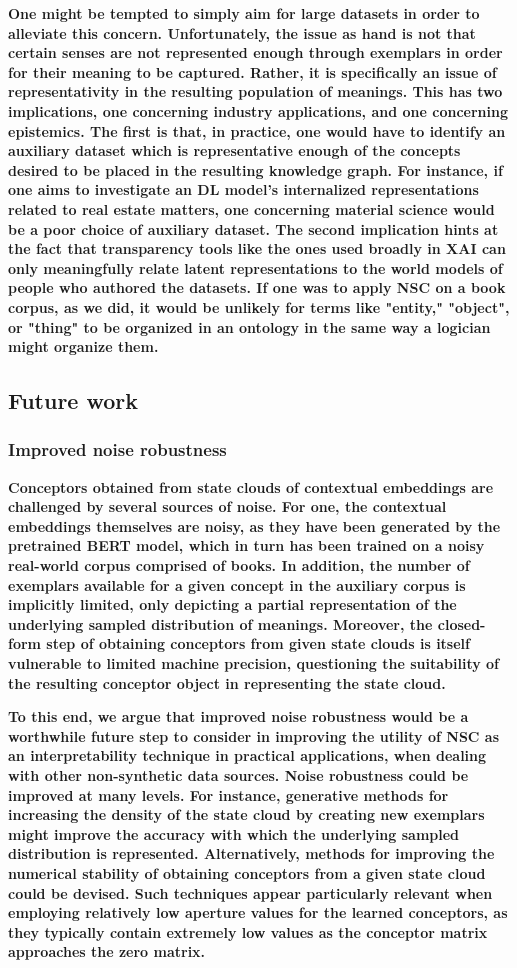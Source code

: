 \textbf{One might be tempted to simply aim for large datasets in order to alleviate this concern. Unfortunately, the issue as hand is not that certain senses are not represented enough through exemplars in order for their meaning to be captured. Rather, it is specifically an issue of representativity in the resulting population of meanings. This has two implications, one concerning industry applications, and one concerning epistemics. The first is that, in practice, one would have to identify an auxiliary dataset which is representative enough of the concepts desired to be placed in the resulting knowledge graph. For instance, if one aims to investigate an DL model's internalized representations related to real estate matters, one concerning material science would be a poor choice of auxiliary dataset. The second implication hints at the fact that transparency tools like the ones used broadly in XAI can only meaningfully relate latent representations to the world models of people who authored the datasets. If one was to apply NSC on a book corpus, as we did, it would be unlikely for terms like "entity," "object", or "thing" to be organized in an ontology in the same way a logician might organize them.}

\subsection{Future work}

\subsubsection{Improved noise robustness}

\textbf{Conceptors obtained from state clouds of contextual embeddings are challenged by several sources of noise. For one, the contextual embeddings themselves are noisy, as they have been generated by the pretrained BERT model, which in turn has been trained on a noisy real-world corpus comprised of books. In addition, the number of exemplars available for a given concept in the auxiliary corpus is implicitly limited, only depicting a partial representation of the underlying sampled distribution of meanings. Moreover, the closed-form step of obtaining conceptors from given state clouds is itself vulnerable to limited machine precision, questioning the suitability of the resulting conceptor object in representing the state cloud.}

\textbf{To this end, we argue that improved noise robustness would be a worthwhile future step to consider in improving the utility of NSC as an interpretability technique in practical applications, when dealing with other non-synthetic data sources. Noise robustness could be improved at many levels. For instance, generative methods for increasing the density of the state cloud by creating new exemplars might improve the accuracy with which the underlying sampled distribution is represented. Alternatively, methods for improving the numerical stability of obtaining conceptors from a given state cloud could be devised. Such techniques appear particularly relevant when employing relatively low aperture values for the learned conceptors, as they typically contain extremely low values as the conceptor matrix approaches the zero matrix.}

